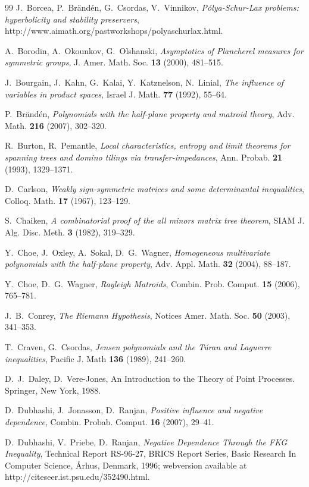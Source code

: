 \documentclass[10pt,reqno]{amsart}
\theoremstyle{plain}
\theoremstyle{definition}
\theoremstyle{remark}
\begin{document}
\begin{thebibliography}{99}
J.~Borcea, P.~Br\"and\'en, G.~Csordas, V.~Vinnikov, {\em P\'olya-Schur-Lax 
problems: hyperbolicity and stability preservers}, 
http://www.aimath.org/pastworkshops/polyaschurlax.html.

A.~Borodin, A.~Okounkov, G.~Olshanski, {\em Asymptotics of Plancherel
measures for symmetric groups}, J. Amer. Math. Soc. {\bf 13} (2000), 481--515.

J.~Bourgain, J.~Kahn, G.~Kalai, Y.~Katznelson, N.~Linial, {\em The influence
of variables in product spaces}, Israel J. Math. {\bf 77} (1992), 55--64.

P.~Br\"and\'en, {\em Polynomials with the half-plane property and matroid 
theory}, Adv. Math. {\bf 216} (2007), 302--320.

R.~Burton, R.~Pemantle, {\em Local characteristics, entropy and limit
theorems for spanning trees and domino tilings via
transfer-impedances}, Ann. Probab. {\bf 21} (1993), 1329--1371.

D.~Carlson, {\em Weakly sign-symmetric matrices and some determinantal 
inequalities}, Colloq. Math. {\bf 17} (1967), 123--129.

S.~Chaiken, {\em A combinatorial proof of the all minors matrix tree theorem}, 
SIAM J. Alg. Disc. Meth. {\bf 3} (1982), 319--329.

Y.~Choe, J.~Oxley, A.~Sokal, D.~G.~Wagner, {\em Homogeneous multivariate 
polynomials with the half-plane property}, 
Adv. Appl. Math. {\bf 32} (2004), 88--187.

Y.~Choe, D.~G.~Wagner, {\em Rayleigh Matroids}, Combin. Prob. Comput. {\bf 15} 
(2006), 765--781.

J.~B.~Conrey, {\em The Riemann Hypothesis}, Notices Amer. Math. Soc. {\bf 50}
(2003), 341--353.

T.~Craven, G.~Csordas, {\em Jensen polynomials and the T\'uran and Laguerre
inequalities}, Pacific J. Math {\bf 136} (1989), 241--260.

D.~J.~Daley, D.~Vere-Jones, An Introduction to the Theory of Point Processes.
Springer, New York, 1988.

D.~Dubhashi, J.~Jonasson, D.~Ranjan, {\em Positive influence and negative 
dependence}, Combin. Probab. Comput. {\bf 16} (2007), 29--41. 

D.~Dubhashi, V.~Priebe, D.~Ranjan, 
{\em Negative Dependence Through the FKG Inequality}, Technical Report 
RS-96-27, BRICS Report Series, Basic Research In Computer Science, \AA rhus, 
Denmark, 1996; webversion available at http://citeseer.ist.psu.edu/352490.html.


\end{thebibliography}
\end{document}
